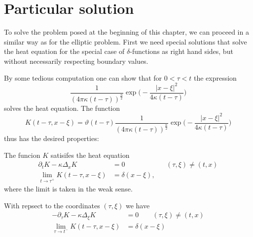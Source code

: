 %
%
%
\section{Particular solution}
To solve the problem posed at the beginning of this chapter, we can
proceed in a similar way as for the elliptic problem.
First we need special solutions that solve the heat equation for
the special case of $\delta$-functions as right hand sides, but without
necessarily respecting boundary values.

By some tedious computation one can show that for $0<\tau<t$
the expression
\[
\frac1{(4\pi\kappa(t-\tau))^{\frac{n}2}}
\exp\biggl(-\frac{|x-\xi|^2}{4\kappa(t-\tau)}\biggr)
\]
solves the heat equation.
The function
\begin{equation}
K(t-\tau, x-\xi)
=
\vartheta(t-\tau)
\frac1{(4\pi\kappa(t-\tau))^{\frac{n}2}}
\exp\biggl(-\frac{|x-\xi|^2}{4\kappa(t-\tau)}\biggr)
\label{parabolischsingulaer}
\end{equation}
thus has the desired properties:

\begin{satz}
The funcion $K$ satisifes the heat equation
\begin{align*}
\partial_tK-\kappa\Delta_xK&=0&&(\tau, \xi)\ne(t,x)
\\
\lim_{t\to\tau^+}K(t-\tau, x-\xi)&=\delta(x-\xi),
\end{align*}
where the limit is taken in the weak sense.

With repsect to the coordinates $(\tau,\xi)$ we have
\begin{align*}
-\partial_{\tau} K-\kappa\Delta_{\xi}K&=0\qquad(\tau,\xi)\ne(t,x)
\\
\lim_{\tau\to t^-}K(t-\tau, x-\xi)&=\delta(x-\xi)
\end{align*}
\end{satz}

